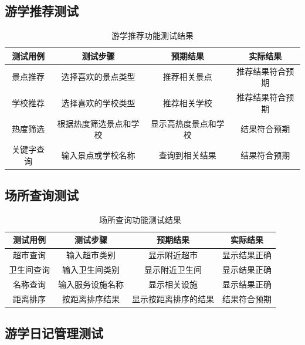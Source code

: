 \documentclass{ctexart}
\begin{document}
\subsection{游学推荐测试}

\begin{table}[H]
    \centering
    \caption{游学推荐功能测试结果}
    \begin{tabular}{|c|c|c|c|}
        \hline
        \textbf{测试用例} & \textbf{测试步骤} & \textbf{预期结果} & \textbf{实际结果} \\ \hline
        景点推荐          & 选择喜欢的景点类型     & 推荐相关景点        & 推荐结果符合预期      \\ \hline
        学校推荐          & 选择喜欢的学校类型     & 推荐相关学校        & 推荐结果符合预期      \\ \hline
        热度筛选          & 根据热度筛选景点和学校   & 显示高热度景点和学校    & 结果符合预期        \\ \hline
        关键字查询         & 输入景点或学校名称     & 查询到相关结果       & 结果符合预期        \\ \hline
    \end{tabular}
\end{table}

\subsection{场所查询测试}

\begin{table}[H]
    \centering
    \caption{场所查询功能测试结果}
    \begin{tabular}{|c|c|c|c|}
        \hline
        \textbf{测试用例} & \textbf{测试步骤} & \textbf{预期结果} & \textbf{实际结果} \\ \hline
        超市查询          & 输入超市类别        & 显示附近超市        & 显示结果正确        \\ \hline
        卫生间查询         & 输入卫生间类别       & 显示附近卫生间       & 显示结果正确        \\ \hline
        名称查询          & 输入服务设施名称      & 显示相关设施        & 显示结果正确        \\ \hline
        距离排序          & 按距离排序结果       & 显示按距离排序的结果    & 结果符合预期        \\ \hline
    \end{tabular}
\end{table}

\subsection{游学日记管理测试}
\end{document}
